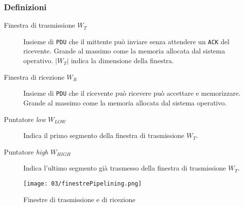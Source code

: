         \subsubsection{Definizioni}
            \begin{description}
                \item[Finestra di trasmissione $W_T$] Insieme di \texttt{PDU} che il mittente può inviare senza attendere un \texttt{ACK} del ricevente.
                    \subitem Grande al massimo come la memoria allocata dal sistema operativo.
                    \subitem $\left|W_T\right|$ indica la dimensione della finestra.
                \item[Finestra di ricezione $W_R$] Insieme di \texttt{PDU} che il ricevente può ricevere può accettare e memorizzare.
                    \subitem Grande al massimo come la memoria allocata dal sistema operativo.
                \item[Puntatore \textit{low} $W_{LOW}$] Indica il primo segmento della finestra di trasmissione $W_T$.
                \item[Puntatore \textit{high} $W_{HIGH}$] Indica l'ultimo segmento già trasmesso della finestra di trasmissione $W_T$.
            \end{description}
        
        \begin{figure}[H]
            \centering
            \texttt{[image: 03/finestrePipelining.png]}
            \caption{Finestre di trasmissione e di ricezione}
        \end{figure}